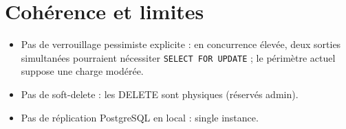 \section{Cohérence et limites}

\begin{itemize}
  \item Pas de verrouillage pessimiste explicite : en concurrence élevée, deux sorties simultanées pourraient nécessiter \texttt{SELECT FOR UPDATE} ; le périmètre actuel suppose une charge modérée.
  \item Pas de soft-delete : les DELETE sont physiques (réservés admin).
  \item Pas de réplication PostgreSQL en local : single instance.
\end{itemize}
